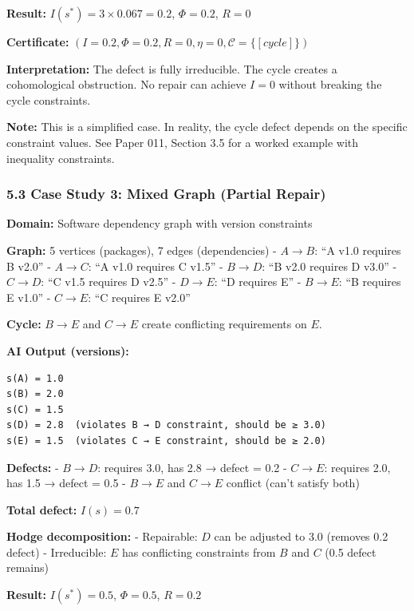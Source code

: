\documentclass[
]{article}
\begin{document}
\textbf{Result:} \(I(s^*) = 3 \times 0.067 = 0.2\), \(\Phi = 0.2\),
\(R = 0\)

\textbf{Certificate:}
\((I = 0.2, \Phi = 0.2, R = 0, \eta = 0, \mathcal{C} = \{[cycle]\})\)

\textbf{Interpretation:} The defect is fully irreducible. The cycle
creates a cohomological obstruction. No repair can achieve \(I = 0\)
without breaking the cycle constraints.

\textbf{Note:} This is a simplified case. In reality, the cycle defect
depends on the specific constraint values. See Paper 011, Section 3.5
for a worked example with inequality constraints.

\subsubsection{5.3 Case Study 3: Mixed Graph (Partial
Repair)}\label{case-study-3-mixed-graph-partial-repair}

\textbf{Domain:} Software dependency graph with version constraints

\textbf{Graph:} 5 vertices (packages), 7 edges (dependencies) -
\(A \to B\): ``A v1.0 requires B v2.0'' - \(A \to C\): ``A v1.0 requires
C v1.5'' - \(B \to D\): ``B v2.0 requires D v3.0'' - \(C \to D\): ``C
v1.5 requires D v2.5'' - \(D \to E\): ``D requires E'' - \(B \to E\):
``B requires E v1.0'' - \(C \to E\): ``C requires E v2.0''

\textbf{Cycle:} \(B \to E\) and \(C \to E\) create conflicting
requirements on \(E\).

\textbf{AI Output (versions):}

\begin{verbatim}
s(A) = 1.0
s(B) = 2.0
s(C) = 1.5
s(D) = 2.8  (violates B → D constraint, should be ≥ 3.0)
s(E) = 1.5  (violates C → E constraint, should be ≥ 2.0)
\end{verbatim}

\textbf{Defects:} - \(B \to D\): requires 3.0, has 2.8 → defect = 0.2 -
\(C \to E\): requires 2.0, has 1.5 → defect = 0.5 - \(B \to E\) and
\(C \to E\) conflict (can't satisfy both)

\textbf{Total defect:} \(I(s) = 0.7\)

\textbf{Hodge decomposition:} - Repairable: \(D\) can be adjusted to 3.0
(removes 0.2 defect) - Irreducible: \(E\) has conflicting constraints
from \(B\) and \(C\) (0.5 defect remains)

\textbf{Result:} \(I(s^*) = 0.5\), \(\Phi = 0.5\), \(R = 0.2\)
\end{document}
